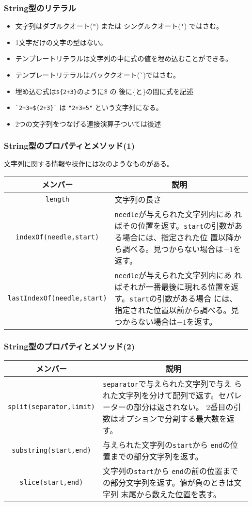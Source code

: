 \begin{frame}[containsverbatim]
 \frametitle{String型のリテラル}
 \begin{itemize}
  \item 文字列はダブルクオート(\Verb+"+)
  または シングルクオート(\Verb+'+) ではさむ。%
  \item 1文字だけの文字の型はない。
  \item テンプレートリテラルは文字列の中に式の値を埋め込むことができる。
  \item テンプレートリテラルはバッククオート(\Verb+`+)ではさむ。
  \item 埋め込む式は\texttt{\$\{2+3\}}のように\$ の
        後に\{と\}の間に式を記述
  \item \Verb-`2+3=${2+3}`- は \Verb-"2+3=5"- という文字列になる。
  \item 2つの文字列をつなげる連接演算子\ElmJ{+}ついては後述
 \end{itemize}
\end{frame}
\begin{frame}[containsverbatim]
 \frametitle{String型のプロパティとメソッド(1)}
文字列に関する情報や操作には次のようなものがある。
\begin{center}
  \begin{tabular}{|c|m{}|}\hline
 メンバー&\multicolumn{1}{c|}{説明} \\\hline
  \Verb+length+ &文字列の長さ\\ \hline
\Verb+indexOf(needle,start)+& \Verb+needle+が与えられた文字列内にあ
      ればその位置を返す。\Verb+start+の引数がある場合には、指定された位
      置以降から調べる。見つからない場合は$-1$を返す。\\\hline
\Verb+lastIndexOf(needle,start)+& \Verb+needle+が与えられた文字列内にあ
      ればそれが一番最後に現れる位置を返す。\Verb+start+の引数がある場合
      には、指定された位置以前から調べる。見つからない場合は$-1$を返す。\\\hline
  \end{tabular}
\end{center}
\end{frame}
\begin{frame}[containsverbatim]
 \frametitle{String型のプロパティとメソッド(2)}
\begin{center}
 \begin{tabular}{|c|m{}|}\hline
 メンバー&\multicolumn{1}{c|}{説明} \\\hline
  \Verb+split(separator,limit)+&\Verb+separator+で与えられた文字列で与え
      られた文字列を分けて配列で返す。セパレーターの部分は返されない。
      2番目の引数はオプションで分割する最大数を返す。\\ \hline
  \Verb+substring(start,end)+&与えられた文字列の\Verb+start+から
      \Verb+end+の位置までの部分文字列を返す。\\ \hline
  \Verb+slice(start,end)+&文字列の\Verb+start+から
      \Verb+end+の前の位置までの部分文字列を返す。値が負のときは文字列
      末尾から数えた位置を表す。\\ \hline
\end{tabular}
\end{center}
\end{frame}
